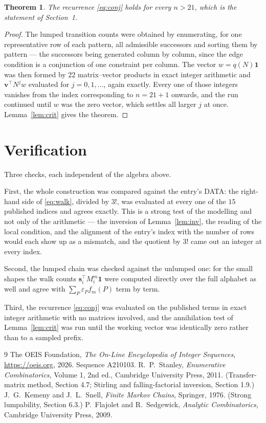 \documentclass[11pt,a4paper]{article}
\theoremstyle{plain}
\newtheorem{theorem}{Theorem}
\theoremstyle{definition}
\begin{document}
\begin{theorem}
The recurrence \eqref{eq:conj} holds for every $n>21$, which is the statement of
Section~1.
\end{theorem}

\begin{proof}
The lumped transition counts were obtained by enumerating, for one representative row of
each pattern, all admissible successors and sorting them by pattern --- the successors being
generated column by column, since the edge condition is a conjunction of one constraint per
column. The vector $w=q(N)\mathbf{1}$ was then formed by $22$ matrix--vector products
in exact integer arithmetic and $\mathbf{v}^{\!\top}N^{j}w$ evaluated for
$j=0,1,\dots$, again exactly. Every one of those integers vanishes from the index
corresponding to $n=21+1$ onwards, and the run continued until $w$ was the zero vector,
which settles all larger $j$ at once. Lemma~\ref{lem:crit} gives the theorem.
\end{proof}

\section{Verification}

Three checks, each independent of the algebra above.

First, the whole construction was compared against the entry's DATA: the right-hand side of
\eqref{eq:walk}, divided by $3!$, was evaluated at every one of the $15$
published indices and agrees exactly. This is a strong test of the modelling and not only of
the arithmetic --- the inversion of Lemma~\ref{lem:inv}, the reading of the local
condition, and the alignment of the entry's index with the number of rows would each
show up as a mismatch, and the quotient by $3!$ came out an integer at every index.

Second, the lumped chain was checked against the unlumped one: for the small shapes the walk
counts $\mathbf{s}_i^{\!\top}M_i^{m}\mathbf{1}$ were computed directly over the full
alphabet as well and agree with $\sum_P\varepsilon_Pf_m(P)$ term by term.

Third, the recurrence \eqref{eq:conj} was evaluated on the published terms in exact integer
arithmetic with no matrices involved, and the annihilation test of Lemma~\ref{lem:crit} was
run until the working vector was identically zero rather than to a sampled prefix.

\begin{thebibliography}{9}
 The OEIS Foundation, \emph{The On-Line Encyclopedia of Integer
Sequences}, \url{https://oeis.org}, 2026. Sequence A210103.
 R.~P.~Stanley, \emph{Enumerative Combinatorics}, Volume 1, 2nd ed.,
Cambridge University Press, 2011. (Transfer-matrix method, Section 4.7; Stirling and
falling-factorial inversion, Section 1.9.)
 J.~G.~Kemeny and J.~L.~Snell, \emph{Finite Markov Chains}, Springer,
1976. (Strong lumpability, Section 6.3.)
 P.~Flajolet and R.~Sedgewick, \emph{Analytic Combinatorics}, Cambridge
University Press, 2009.
\end{thebibliography}
\end{document}
